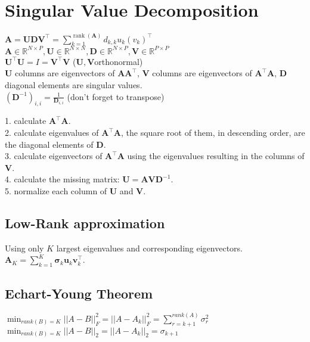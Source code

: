 \section{Singular Value Decomposition}
$\mathbf{A} = \mathbf{U} \mathbf{D} \mathbf{V}^\top = \sum_{k=1}^{\operatorname{rank}(\mathbf{A})} d_{k,k} u_k (v_k)^\top$\\
$\mathbf{A} \in \mathbb{R}^{N \times P}, \mathbf{U} \in \mathbb{R}^{N \times N}, \mathbf{D} \in \mathbb{R}^{N \times P}, \mathbf{V} \in \mathbb{R}^{P \times P}$\\
$\mathbf{U}^\top \mathbf{U} = I = \mathbf{V}^\top \mathbf{V}$ ($\mathbf{U}, \mathbf{V}$orthonormal)\\
$\mathbf{U}$ columns are eigenvectors of $\mathbf{A} \mathbf{A}^\top$, $\mathbf{V}$ columns are eigenvectors of $\mathbf{A}^\top \mathbf{A}$, $\mathbf{D}$ diagonal elements are singular values.\\
$(\mathbf{D}^{-1})_{i,i} = \frac{1}{\mathbf{D}_{i, i}}$ (don't forget to transpose)

1. calculate $\mathbf{A}^\top \mathbf{A}$.\\
2. calculate eigenvalues of $\mathbf{A}^\top \mathbf{A}$, the square root of them, in descending order, are the diagonal elements of $\mathbf{D}$.\\
3. calculate eigenvectors of $\mathbf{A}^\top \mathbf{A}$ using the eigenvalues resulting in the columns of $\mathbf{V}$.\\
4. calculate the missing matrix: $\mathbf{U} = \mathbf{A} \mathbf{V} \mathbf{D}^{-1}$.\\
5. normalize each column of $\mathbf{U}$ and $\mathbf{V}$.

\subsection*{Low-Rank approximation}
Using only $K$ largest eigenvalues and corresponding eigenvectors. $\mathbf{A}_{K} = \sum_{k=1}^K \mathbf{\sigma}_{k} \mathbf{u}_{k} \mathbf{v}^\top_{k}$.

\subsection*{Echart-Young Theorem}
$\min_{rank(B)=K} ||A-B||_F^2 = ||A-A_k||_F^2 = \sum_{r=k+1}^{rank(A)} \sigma_r^2$
$\min_{rank(B)=K} ||A-B||_2 = ||A-A_k||_2 = \sigma_{k+1}$
\vspace{6mm}
